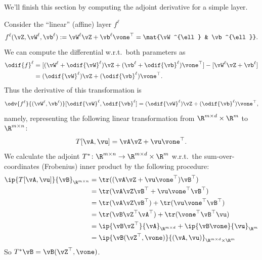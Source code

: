\documentclass[../../book-main.tex]{subfiles}
\begin{document}
We'll finish this section by computing the adjoint derivative for a simple layer.
\begin{example}
    Consider the ``linear'' (affine) layer \(f^{\ell}\)
    \begin{equation}
        f^{\ell}(\vZ, \vW^{\ell}, \vb^{\ell}) := \vW^{\ell}\vZ + \vb^{\ell}\vone^{\top} = \mat{\vW^{\ell} & \vb^{\ell}}.
    \end{equation}
    We can compute the differential w.r.t.~both parameters as
    \begin{align}
        \odif{f}^{\ell}
        &= [(\vW^{\ell} + \odif{\vW}^{\ell})\vZ + (\vb^{\ell} + \odif{\vb}^{\ell})\vone^{\top}] - [\vW^{\ell}\vZ + \vb^{\ell}] \\ 
        &= (\odif{\vW}^{\ell})\vZ + (\odif{\vb}^{\ell})\vone^{\top}.
    \end{align}
    Thus the derivative of this transformation is 
    \begin{equation}
        \odv{f^{\ell}}{(\vW^{\ell}, \vb^{\ell})}[\odif{\vW}^{\ell}, \odif{\vb}^{\ell}] = (\odif{\vW}^{\ell})\vZ + (\odif{\vb}^{\ell})\vone^{\top},
    \end{equation}
    namely, representing the following linear transformation from \(\R^{m \times d} \times \R^{m}\) to \(\R^{m \times n}\):
    \begin{equation}
        T[\vA, \vu] = \vA\vZ + \vu\vone^{\top}.
    \end{equation}
    We calculate the adjoint \(T^{*} \colon \R^{m \times n} \to \R^{m \times d} \times \R^{m}\) w.r.t.~the sum-over-coordinates (Frobenius) inner product by the following procedure:
    \begin{align}
        \ip{T[\vA, \vu]}{\vB}_{\R^{m \times n}} 
        &= \tr((\vA\vZ + \vu\vone^{\top})\vB^{\top}) \\
        &= \tr(\vA\vZ\vB^{\top} + \vu\vone^{\top}\vB^{\top}) \\
        &= \tr(\vA\vZ\vB^{\top}) + \tr(\vu\vone^{\top}\vB^{\top}) \\
        &= \tr(\vB\vZ^{\top}\vA^{\top}) + \tr(\vone^{\top}\vB^{\top}\vu) \\
        &= \ip{\vB\vZ^{\top}}{\vA}_{\R^{m \times d}} + \ip{\vB\vone}{\vu}_{\R^{m}} \\
        &= \ip{\vB(\vZ^{\top}, \vone)}{(\vA, \vu)}_{\R^{m \times d} \times \R^{m}}
    \end{align}
    So \(T^{*}\vB = \vB(\vZ^{\top}, \vone)\).
\end{example}
\end{document}
